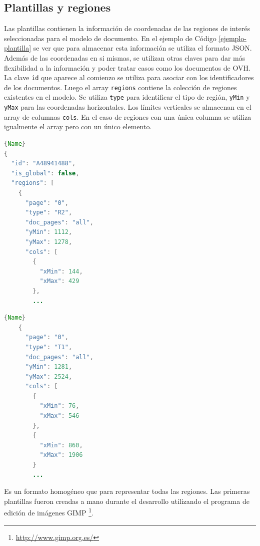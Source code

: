 \subsection{Plantillas y regiones}


Las plantillas contienen la información de coordenadas de las regiones de interés seleccionadas para el modelo de documento. En el ejemplo de Código \ref{ejemplo-plantilla} se ver que para almacenar esta información se utiliza el formato JSON. Además de las coordenadas en si mismas, se utilizan otras claves para dar más flexibilidad a la información y poder tratar casos como los documentos de OVH. La clave \verb|id| que aparece al comienzo se utiliza para asociar con los identificadores de los documentos. Luego el array \verb|regions| contiene la colección de regiones existentes en el modelo. Se utiliza \verb|type| para identificar el tipo de región, \verb|yMin| y \verb|yMax| para las coordenadas horizontales. Los límites verticales se almacenan en el array de columnas \verb|cols|. En el caso de regiones con una única columna se utiliza igualmente el array pero con un único elemento.

\noindent\begin{minipage}{.45\textwidth}
    \begin{lstlisting}[language=Java,caption=Comienzo de la plantilla.,frame=tlrb]{Name}
{
  "id": "A48941488",
  "is_global": false,
  "regions": [
    {
      "page": "0",
      "type": "R2",
      "doc_pages": "all",
      "yMin": 1112,
      "yMax": 1278,
      "cols": [
        {
          "xMin": 144,
          "xMax": 429
        },
        ...
    \end{lstlisting}
\end{minipage}\hfill
\begin{minipage}{.45\textwidth}
    \begin{lstlisting}[language=Java,caption=Región T1.,frame=tlrb]{Name}
    {
      "page": "0",
      "type": "T1",
      "doc_pages": "all",
      "yMin": 1281,
      "yMax": 2524,
      "cols": [
        {
          "xMin": 76,
          "xMax": 546
        },
        {
          "xMin": 860,
          "xMax": 1906
        }
        ...
    \end{lstlisting}
\end{minipage}

Es un formato homogéneo que para representar todas las regiones. Las primeras plantillas fueron creadas a mano durante el desarrollo utilizando el programa de edición de imágenes GIMP \footnote{\url{http://www.gimp.org.es/}}.

